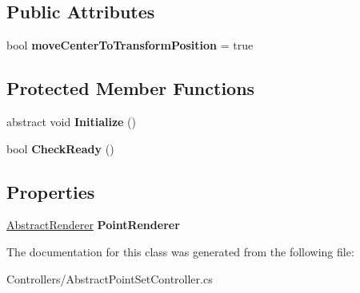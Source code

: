 \subsection*{Public Attributes}
\begin{DoxyCompactItemize}
\item 
\mbox{\label{class_controllers_1_1_abstract_point_set_controller_a3c7db48c8fefd07e67df31986a265a30}} 
bool {\bfseries move\+Center\+To\+Transform\+Position} = true
\end{DoxyCompactItemize}
\subsection*{Protected Member Functions}
\begin{DoxyCompactItemize}
\item 
\mbox{\label{class_controllers_1_1_abstract_point_set_controller_a8c7a3bc2173d6b23d8cd37b09c6cfe19}} 
abstract void {\bfseries Initialize} ()
\item 
\mbox{\label{class_controllers_1_1_abstract_point_set_controller_a55485e0fbdd9f8154e140b2b79d0c787}} 
bool {\bfseries Check\+Ready} ()
\end{DoxyCompactItemize}
\subsection*{Properties}
\begin{DoxyCompactItemize}
\item 
\mbox{\label{class_controllers_1_1_abstract_point_set_controller_ae05783b13871739392e1ce5fdb23ffbe}} 
\hyperlink{interface_loading_1_1_abstract_renderer}{Abstract\+Renderer} {\bfseries Point\+Renderer}
\end{DoxyCompactItemize}


The documentation for this class was generated from the following file\+:\begin{DoxyCompactItemize}
\item 
Controllers/Abstract\+Point\+Set\+Controller.\+cs\end{DoxyCompactItemize}
